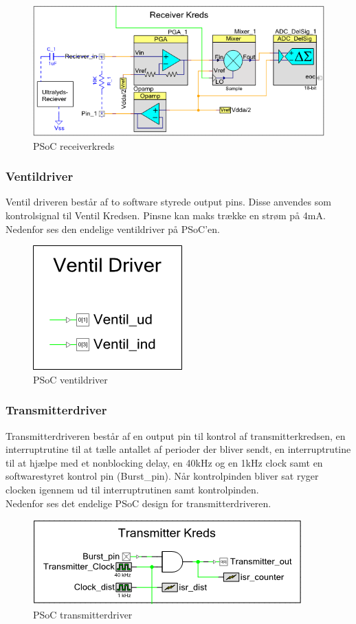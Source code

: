 \begin{figure}[H]
\centering
\includegraphics[scale=.75]{billeder/psocreceiverkreds}
\caption{PSoC receiverkreds }
\label{fig:psocreceiverkreds}
\end{figure}
\newpage
\subsubsection{Ventildriver}
Ventil driveren består af to software styrede output pins. Disse anvendes som kontrolsignal til Ventil Kredsen. Pinsne kan maks trække en strøm på 4mA. Nedenfor ses den endelige ventildriver på PSoC'en. 
\begin{figure}[H]
\centering
\includegraphics[scale=.5]{billeder/psocventildriver}
\caption{PSoC ventildriver}
\label{fig:psocventildriver}
\end{figure}

\subsubsection{Transmitterdriver}
Transmitterdriveren består af en output pin til kontrol af transmitterkredsen, en interruptrutine til at tælle antallet af perioder der bliver sendt, en interruptrutine til at hjælpe med et nonblocking delay, en 40kHz og en 1kHz clock samt en softwarestyret kontrol pin (Burst\_pin). Når kontrolpinden bliver sat ryger clocken igennem ud til interruptrutinen samt kontrolpinden. \\
Nedenfor ses det endelige PSoC design for transmitterdriveren.
\begin{figure}[H]
\centering
\includegraphics[scale=.8]{billeder/psoctransmitterdriver}
\caption{PSoC transmitterdriver}
\label{fig:psoctransmitterdriver}
\end{figure}
\newpage

